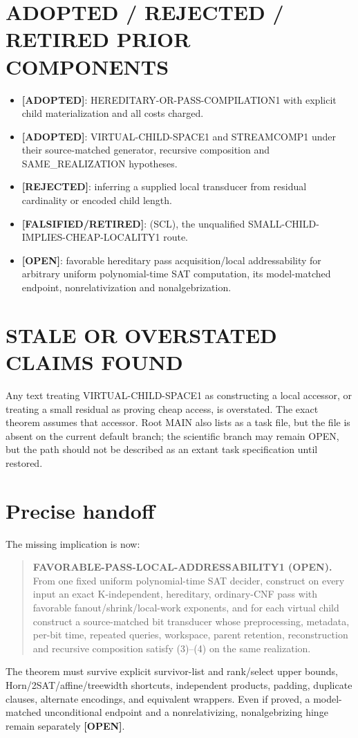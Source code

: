 \documentclass[11pt]{article}
\newcommand{\status}[1]{\textbf{[#1]}}
\begin{document}
\section{ADOPTED / REJECTED / RETIRED PRIOR COMPONENTS}

\begin{itemize}
\item \status{ADOPTED}: HEREDITARY-OR-PASS-COMPILATION1 with explicit child
materialization and all costs charged.
\item \status{ADOPTED}: VIRTUAL-CHILD-SPACE1 and STREAMCOMP1 under their
source-matched generator, recursive composition and SAME\_REALIZATION
hypotheses.
\item \status{REJECTED}: inferring a supplied local transducer from residual
cardinality or encoded child length.
\item \status{FALSIFIED/RETIRED}: (SCL), the unqualified
SMALL-CHILD-IMPLIES-CHEAP-LOCALITY1 route.
\item \status{OPEN}: favorable hereditary pass acquisition/local
addressability for arbitrary uniform polynomial-time SAT computation, its
model-matched endpoint, nonrelativization and nonalgebrization.
\end{itemize}

\section{STALE OR OVERSTATED CLAIMS FOUND}

Any text treating VIRTUAL-CHILD-SPACE1 as constructing a local accessor, or
treating a small residual as proving cheap access, is overstated.  The exact
theorem assumes that accessor.  Root MAIN also lists
 as a task file, but the file is absent on
the current default branch; the scientific branch may remain OPEN, but the
path should not be described as an extant task specification until restored.

\section{Precise handoff}

The missing implication is now:
\begin{quote}
\textbf{FAVORABLE-PASS-LOCAL-ADDRESSABILITY1 (OPEN).}  From one fixed uniform
polynomial-time SAT decider, construct on every input an exact K-independent,
hereditary, ordinary-CNF pass with favorable fanout/shrink/local-work
exponents, and for each virtual child construct a source-matched bit
transducer whose preprocessing, metadata, per-bit time, repeated queries,
workspace, parent retention, reconstruction and recursive composition satisfy
(3)--(4) on the same realization.
\end{quote}
The theorem must survive explicit survivor-list and rank/select upper bounds,
Horn/2SAT/affine/treewidth shortcuts, independent products, padding,
duplicate clauses, alternate encodings, and equivalent wrappers.  Even if
proved, a model-matched unconditional endpoint and a nonrelativizing,
nonalgebrizing hinge remain separately \status{OPEN}.
\end{document}
